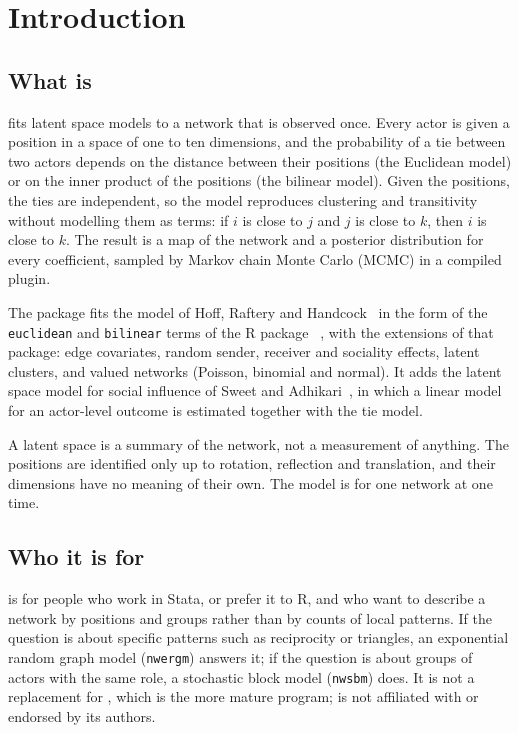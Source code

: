 \chapter{Introduction}\label{ch:intro}

\section{What \texorpdfstring{\nwlsm}{nwlsm} is}

\nwlsm{} fits latent space models to a network that is observed once. Every actor is given a position in a space of one to ten dimensions, and the probability of a tie between two actors depends on the distance between their positions (the Euclidean model) or on the inner product of the positions (the bilinear model). Given the positions, the ties are independent, so the model reproduces clustering and transitivity without modelling them as terms: if $i$ is close to $j$ and $j$ is close to $k$, then $i$ is close to $k$. The result is a map of the network and a posterior distribution for every coefficient, sampled by Markov chain Monte Carlo (MCMC) in a compiled plugin.

The package fits the model of Hoff, Raftery and Handcock~\cite{hoff2002} in the form of the \texttt{euclidean} and \texttt{bilinear} terms of the R package \latentnet{}~\cite{krivitsky2008,latentnetpkg}, with the extensions of that package: edge covariates, random sender, receiver and sociality effects, latent clusters, and valued networks (Poisson, binomial and normal). It adds the latent space model for social influence of Sweet and Adhikari~\cite{sweet2020}, in which a linear model for an actor-level outcome is estimated together with the tie model.

A latent space is a summary of the network, not a measurement of anything. The positions are identified only up to rotation, reflection and translation, and their dimensions have no meaning of their own. The model is for one network at one time.

\section{Who it is for}

\nwlsm{} is for people who work in Stata, or prefer it to R, and who want to describe a network by positions and groups rather than by counts of local patterns. If the question is about specific patterns such as reciprocity or triangles, an exponential random graph model (\texttt{nwergm}) answers it; if the question is about groups of actors with the same role, a stochastic block model (\texttt{nwsbm}) does. It is not a replacement for \latentnet{}, which is the more mature program; \nwlsm{} is not affiliated with or endorsed by its authors.

